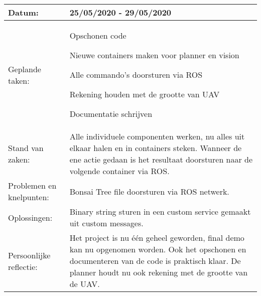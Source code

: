 \begin{tabularx}{\textwidth}{| l | X |}
  \hline
  Datum: & 25/05/2020 - 29/05/2020\\
  \hline
  Geplande taken: &
  \begin{compactitem}
    \item Opschonen code
    \item Nieuwe containers maken voor planner en vision
    \item Alle commando's doorsturen via ROS
    \item Rekening houden met de grootte van UAV
    \item Documentatie schrijven
  \end{compactitem}\\
  \hline
  Stand van zaken: & Alle individuele componenten werken, nu alles uit elkaar halen en in containers steken. Wanneer de ene actie gedaan is het resultaat doorsturen naar de volgende container via ROS.\\
  \hline
  Problemen en knelpunten: & Bonsai Tree file doorsturen via ROS netwerk.\\
  \hline
  Oplossingen: & Binary string sturen in een custom service gemaakt uit custom messages.\\
  \hline
  Persoonlijke reflectie: & Het project is nu \'e\'en geheel geworden, final demo kan nu opgenomen worden. Ook het opschonen en documenteren van de code is praktisch klaar. De planner houdt nu ook rekening met de grootte van de UAV.\\
  \hline
\end{tabularx}